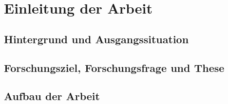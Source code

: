 \chapter{Einleitung der Arbeit}

\section{Hintergrund und Ausgangssituation}



\section{Forschungsziel, Forschungsfrage und These}



\section{Aufbau der Arbeit}


